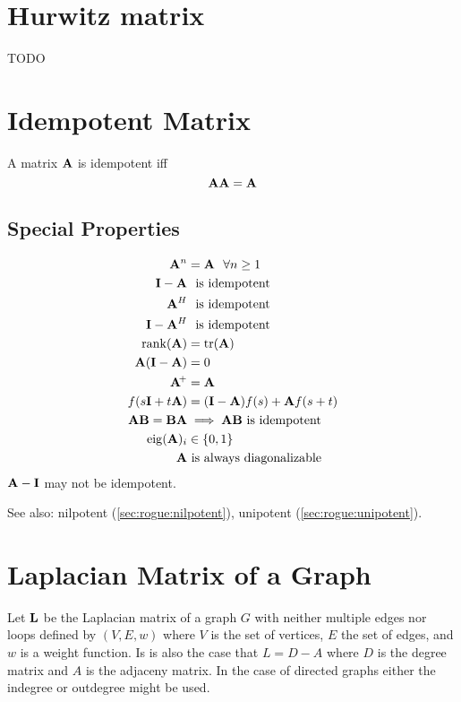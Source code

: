 \section{Hurwitz matrix}
TODO


\section{Idempotent Matrix}
A matrix $\mathbf{A}$ is idempotent iff
\begin{equation}
\mathbf{A}\mathbf{A}=\mathbf{A}
\end{equation}

\subsection*{Special Properties}
\begin{align}
\mathbf{A}^n        &=\mathbf{A}~~\forall n\ge1        \\
\mathbf{I}-\mathbf{A}      &~~\textrm{is idempotent}   \\
\mathbf{A}^H        &~~\textrm{is idempotent}   \\
\mathbf{I}-\mathbf{A}^H    &~~\textrm{is idempotent}   \\
\operatorname{rank}(\mathbf{A})   &= \operatorname{tr}(\mathbf{A})              \\
\mathbf{A}(\mathbf{I}-\mathbf{A})   &= 0                      \\
\mathbf{A}\!^+     &= \mathbf{A}                      \\
f(s\mathbf{I}+t\mathbf{A}) &= (\mathbf{I}-\mathbf{A})f(s)+\mathbf{A} f(s+t) \\
\mathbf{A}\mathbf{B}=\mathbf{B}\mathbf{A}&\implies \mathbf{A}\mathbf{B}~\textrm{is idempotent} \\
\operatorname{eig}(\mathbf{A})_i  &\in \{0,1\} \\
\mathbf{A} & \textrm{~is always diagonalizable}
\end{align}
$\mathbf{A}-\mathbf{I}$ may not be idempotent.

See also: nilpotent (\autoref{sec:rogue:nilpotent}), unipotent (\autoref{sec:rogue:unipotent}).


\section{Laplacian Matrix of a Graph}
Let $\mathbf{L}$ be the Laplacian matrix of a graph $G$ with neither multiple edges nor loops defined by $(V,E,w)$ where $V$ is the set of vertices, $E$ the set of edges, and $w$ is a weight function. Is is also the case that $L=D-A$ where $D$ is the degree matrix and $A$ is the adjaceny matrix. In the case of directed graphs either the indegree or outdegree might be used.

